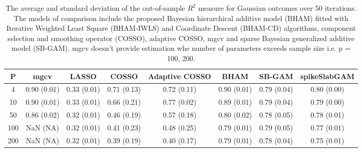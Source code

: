 \begin{table}[ht]
\centering
\begin{tabular}{cccccccc}
  \hline
P & mgcv & LASSO & COSSO & Adaptive COSSO & BHAM & SB-GAM & spikeSlabGAM \\ 
  \hline
  4 & 0.90 (0.01) & 0.33 (0.01) & 0.71 (0.13) & 0.72 (0.11) & 0.90 (0.01) & 0.79 (0.04) & 0.80 (0.00) \\ 
   10 & 0.90 (0.01) & 0.33 (0.01) & 0.66 (0.21) & 0.77 (0.02) & 0.89 (0.01) & 0.79 (0.04) & 0.79 (0.00) \\ 
   50 & 0.86 (0.02) & 0.32 (0.01) & 0.46 (0.19) & 0.57 (0.18) & 0.80 (0.02) & 0.78 (0.05) & 0.78 (0.01) \\ 
  100 & NaN (NA) & 0.32 (0.01) & 0.41 (0.23) & 0.48 (0.25) & 0.79 (0.01) & 0.79 (0.05) & 0.77 (0.01) \\ 
  200 & NaN (NA) & 0.32 (0.01) & 0.39 (0.19) & 0.40 (0.17) & 0.79 (0.01) & 0.78 (0.04) & 0.75 (0.01) \\ 
   \hline
\end{tabular}
\caption{The average and standard deviation of the out-of-sample $R^2$ measure for
    Gaussian outcomes over 50 iterations. The models of comparison include the proposed Bayesian
    hierarchical additive model (BHAM) fitted with Iterative Weighted Least Square (BHAM-IWLS) and
    Coordinate Descent (BHAM-CD) algorithms, component selection and smoothing operator (COSSO), adaptive
    COSSO, mgcv and sparse Bayesian generalized additive model (SB-GAM). mgcv doesn't provide estimation
    whe number of parameters exceeds sample size i.e. p = 100, 200.} 
\label{tab:gaus}
\end{table}
